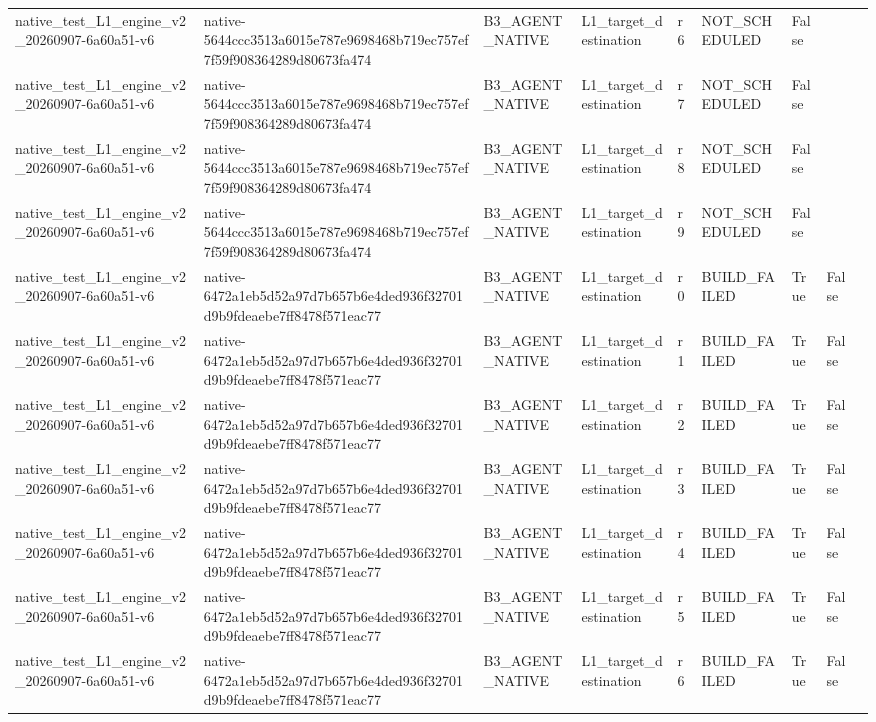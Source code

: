 \begin{tabular}{lllllllll}
native\_test\_L1\_engine\_v2\_20260907-6a60a51-v6 & native-5644ccc3513a6015e787e9698468b719ec757ef7f59f908364289d80673fa474 & B3\_AGENT\_NATIVE & L1\_target\_destination & r6 & NOT\_SCHEDULED & False &  &  \\
native\_test\_L1\_engine\_v2\_20260907-6a60a51-v6 & native-5644ccc3513a6015e787e9698468b719ec757ef7f59f908364289d80673fa474 & B3\_AGENT\_NATIVE & L1\_target\_destination & r7 & NOT\_SCHEDULED & False &  &  \\
native\_test\_L1\_engine\_v2\_20260907-6a60a51-v6 & native-5644ccc3513a6015e787e9698468b719ec757ef7f59f908364289d80673fa474 & B3\_AGENT\_NATIVE & L1\_target\_destination & r8 & NOT\_SCHEDULED & False &  &  \\
native\_test\_L1\_engine\_v2\_20260907-6a60a51-v6 & native-5644ccc3513a6015e787e9698468b719ec757ef7f59f908364289d80673fa474 & B3\_AGENT\_NATIVE & L1\_target\_destination & r9 & NOT\_SCHEDULED & False &  &  \\
native\_test\_L1\_engine\_v2\_20260907-6a60a51-v6 & native-6472a1eb5d52a97d7b657b6e4ded936f32701d9b9fdeaebe7ff8478f571eac77 & B3\_AGENT\_NATIVE & L1\_target\_destination & r0 & BUILD\_FAILED & True & False &  \\
native\_test\_L1\_engine\_v2\_20260907-6a60a51-v6 & native-6472a1eb5d52a97d7b657b6e4ded936f32701d9b9fdeaebe7ff8478f571eac77 & B3\_AGENT\_NATIVE & L1\_target\_destination & r1 & BUILD\_FAILED & True & False &  \\
native\_test\_L1\_engine\_v2\_20260907-6a60a51-v6 & native-6472a1eb5d52a97d7b657b6e4ded936f32701d9b9fdeaebe7ff8478f571eac77 & B3\_AGENT\_NATIVE & L1\_target\_destination & r2 & BUILD\_FAILED & True & False &  \\
native\_test\_L1\_engine\_v2\_20260907-6a60a51-v6 & native-6472a1eb5d52a97d7b657b6e4ded936f32701d9b9fdeaebe7ff8478f571eac77 & B3\_AGENT\_NATIVE & L1\_target\_destination & r3 & BUILD\_FAILED & True & False &  \\
native\_test\_L1\_engine\_v2\_20260907-6a60a51-v6 & native-6472a1eb5d52a97d7b657b6e4ded936f32701d9b9fdeaebe7ff8478f571eac77 & B3\_AGENT\_NATIVE & L1\_target\_destination & r4 & BUILD\_FAILED & True & False &  \\
native\_test\_L1\_engine\_v2\_20260907-6a60a51-v6 & native-6472a1eb5d52a97d7b657b6e4ded936f32701d9b9fdeaebe7ff8478f571eac77 & B3\_AGENT\_NATIVE & L1\_target\_destination & r5 & BUILD\_FAILED & True & False &  \\
native\_test\_L1\_engine\_v2\_20260907-6a60a51-v6 & native-6472a1eb5d52a97d7b657b6e4ded936f32701d9b9fdeaebe7ff8478f571eac77 & B3\_AGENT\_NATIVE & L1\_target\_destination & r6 & BUILD\_FAILED & True & False &  \\

\end{tabular}
